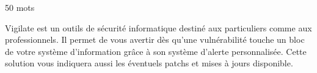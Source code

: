 \begin{flushleft} \LARGE 50 mots \\  \end{flushleft}
Vigilate est un outils de sécurité informatique destiné aux particuliers comme aux professionnels. Il permet de vous avertir dès qu’une vulnérabilité touche un bloc de votre système d’information grâce à son système d’alerte personnalisée. Cette solution vous indiquera aussi les éventuels patchs et mises à jours disponible. 
